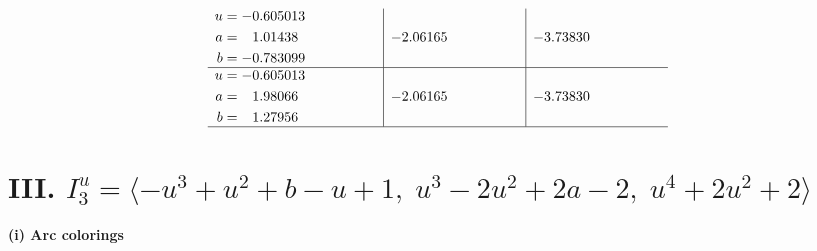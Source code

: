 \documentclass[1p]{elsarticle_modified}
\theoremstyle{definition}
\begin{document}
$$\begin{array}{c|c|c}
\begin{aligned}
u &= -0.605013\phantom{ +0.000000I} \\
a &= \phantom{-}1.01438\phantom{ +0.000000I} \\
b &= -0.783099\phantom{ +0.000000I}\end{aligned}
 & -2.06165\phantom{ +0.000000I} & -3.73830\phantom{ +0.000000I} \\ \hline\begin{aligned}
u &= -0.605013\phantom{ +0.000000I} \\
a &= \phantom{-}1.98066\phantom{ +0.000000I} \\
b &= \phantom{-}1.27956\phantom{ +0.000000I}\end{aligned}
 & -2.06165\phantom{ +0.000000I} & -3.73830\phantom{ +0.000000I}\\
 \hline 
 \end{array}$$\newpage\newpage\renewcommand{\arraystretch}{1}
\centering \section*{III. $I^u_{3}= \langle - u^3+u^2+b- u+1,\;u^3-2 u^2+2 a-2,\;u^4+2 u^2+2 \rangle$}
\flushleft \textbf{(i) Arc colorings}\\
\end{document}
